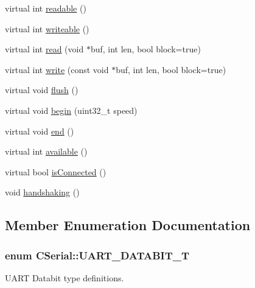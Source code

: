 \begin{DoxyCompactItemize}
\item 
virtual int \hyperlink{class_c_serial_a0748723f610ddcfdc34286dbbfbd4917}{readable} ()
\item 
virtual int \hyperlink{class_c_serial_ac59cfe80216e1fb7eb479017f0bb8e7f}{writeable} ()
\item 
virtual int \hyperlink{class_c_serial_a9b658bf4bc4d81413627bc2fe81e1471}{read} (void $\ast$buf, int len, bool block=true)
\item 
virtual int \hyperlink{class_c_serial_adef6d3e77843c65617b7cb555c2f8732}{write} (const void $\ast$buf, int len, bool block=true)
\item 
virtual void \hyperlink{class_c_serial_a68aecf6351423ae0e8791870c9e694bf}{flush} ()
\item 
virtual void \hyperlink{class_c_serial_a678403bcefc3bd7dfc603c334383b8df}{begin} (uint32\-\_\-t speed)
\item 
virtual void \hyperlink{class_c_serial_a4fb5a06c1d1f746c834088c8beeb3097}{end} ()
\item 
virtual int \hyperlink{class_c_serial_a5c142221c0841e7c961e962c45bd2db7}{available} ()
\item 
virtual bool \hyperlink{class_c_serial_ae7c133c4586cd5ca729cd026f813a8a0}{is\-Connected} ()
\item 
void \hyperlink{class_c_serial_a9dc5498e6cae5a2d0d12cb57fc6ee335}{handshaking} ()
\end{DoxyCompactItemize}


\subsection{Member Enumeration Documentation}
\hypertarget{class_c_serial_a628c8c9be04f0315c4dae70ce8ccc5b3}{
\subsubsection[{U\-A\-R\-T\-\_\-\-D\-A\-T\-A\-B\-I\-T\-\_\-\-T}]{\setlength{\rightskip}{0pt plus 5cm}enum {\bf C\-Serial\-::\-U\-A\-R\-T\-\_\-\-D\-A\-T\-A\-B\-I\-T\-\_\-\-T}}}\label{class_c_serial_a628c8c9be04f0315c4dae70ce8ccc5b3}


U\-A\-R\-T Databit type definitions. 

